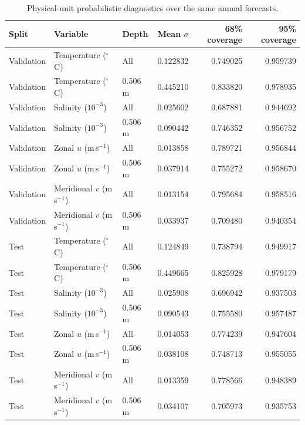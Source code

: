 \begin{table}[p]
\centering\scriptsize
\caption{Physical-unit probabilistic diagnostics over the same annual forecasts.}
\label{tab:physical-probabilistic-results}
\begin{tabular}{lllrrr}
\toprule
Split & Variable & Depth & Mean $\sigma$ & 68\% coverage & 95\% coverage \\
\midrule
Validation & Temperature ($^\circ$C) & All & 0.122832 & 0.749025 & 0.959739 \\
Validation & Temperature ($^\circ$C) & 0.506 m & 0.445210 & 0.833820 & 0.978935 \\
Validation & Salinity ($10^{-3}$) & All & 0.025602 & 0.687881 & 0.944692 \\
Validation & Salinity ($10^{-3}$) & 0.506 m & 0.090442 & 0.746352 & 0.956752 \\
Validation & Zonal $u$ (m\,s$^{-1}$) & All & 0.013858 & 0.789721 & 0.956844 \\
Validation & Zonal $u$ (m\,s$^{-1}$) & 0.506 m & 0.037914 & 0.755272 & 0.958670 \\
Validation & Meridional $v$ (m\,s$^{-1}$) & All & 0.013154 & 0.795684 & 0.958516 \\
Validation & Meridional $v$ (m\,s$^{-1}$) & 0.506 m & 0.033937 & 0.709480 & 0.940354 \\
Test & Temperature ($^\circ$C) & All & 0.124849 & 0.738794 & 0.949917 \\
Test & Temperature ($^\circ$C) & 0.506 m & 0.449665 & 0.825928 & 0.979179 \\
Test & Salinity ($10^{-3}$) & All & 0.025908 & 0.696942 & 0.937503 \\
Test & Salinity ($10^{-3}$) & 0.506 m & 0.090543 & 0.755580 & 0.957487 \\
Test & Zonal $u$ (m\,s$^{-1}$) & All & 0.014053 & 0.774239 & 0.947604 \\
Test & Zonal $u$ (m\,s$^{-1}$) & 0.506 m & 0.038108 & 0.748713 & 0.955055 \\
Test & Meridional $v$ (m\,s$^{-1}$) & All & 0.013359 & 0.778566 & 0.948389 \\
Test & Meridional $v$ (m\,s$^{-1}$) & 0.506 m & 0.034107 & 0.705973 & 0.935753 \\
\bottomrule
\end{tabular}
\end{table}
